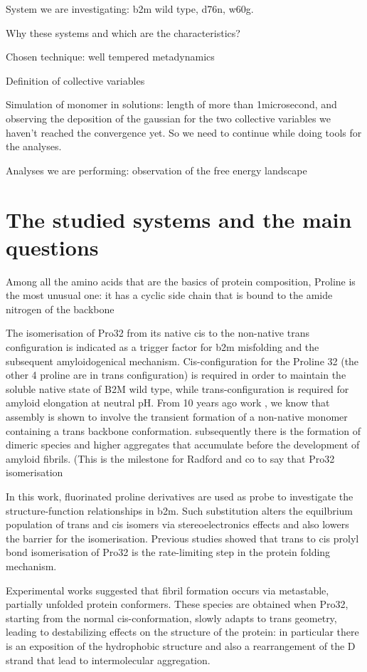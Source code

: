 System we are investigating: b2m wild type, d76n, w60g.

Why these systems and which are the characteristics?

Chosen technique: well tempered metadynamics

Definition of collective variables

Simulation of monomer in solutions: length of more than 1microsecond, and observing the deposition of the gaussian for the two collective variables we haven't reached the convergence yet. So we need to continue while doing tools for the analyses.

Analyses we are performing:
observation of the free energy landscape 


\section{The studied systems and the main questions}
Among all the amino acids that are the basics of protein composition, Proline is the most unusual one: it has a cyclic side chain that is bound to the amide nitrogen of the backbone  

\cite{Eichner_2009}
The isomerisation of Pro32 from its native cis to the non-native trans configuration is indicated as a trigger factor for b2m misfolding and the subsequent amyloidogenical mechanism.
Cis-configuration for the Proline 32 (the other 4 proline are in trans configuration) is required in order to maintain the soluble native state of B2M wild type, while trans-configuration is required for amyloid elongation at neutral pH. From 10 years ago work \cite{Eichner_2009} , we know that assembly is shown to involve the transient formation of a non-native monomer containing a trans backbone conformation. subsequently there is the formation of dimeric species and higher aggregates that accumulate before the development of amyloid fibrils. (This is the milestone for Radford and co to say that Pro32 isomerisation

In this work, fluorinated proline derivatives are used as probe to investigate the structure-function relationships in b2m. Such substitution alters the equilbrium population of trans and cis isomers via stereoelectronics effects and also lowers the barrier for the isomerisation.
Previous studies showed that trans to cis prolyl bond isomerisation of Pro32 is the rate-limiting step in the protein folding mechanism.

Experimental works suggested that fibril formation occurs via metastable, partially unfolded protein conformers. These species are obtained when Pro32, starting from the normal cis-conformation, slowly adapts to trans geometry, leading to destabilizing effects on the structure of the protein: in particular there is an exposition of the hydrophobic structure and also a rearrangement of the D strand that lead to intermolecular aggregation. 